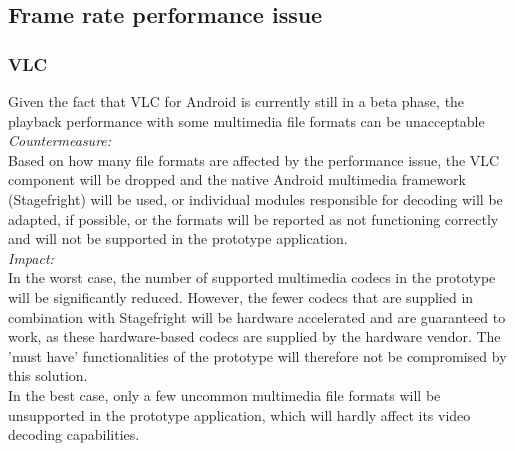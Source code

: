 \subsection{Frame rate performance issue}
\subsubsection{VLC}
Given the fact that VLC for Android is currently still in a beta phase, the playback performance with some multimedia file formats can be unacceptable\\
\newline
\textit{Countermeasure:}\\
Based on how many file formats are affected by the performance issue, the VLC component will be dropped and the native Android multimedia framework (Stagefright) will be used, or individual modules responsible for decoding will be adapted, if possible, or the formats will be reported as not functioning correctly and will not be supported in the prototype application.\\
\newline
\textit{Impact:}\\
In the worst case, the number of supported multimedia codecs in the prototype will be significantly reduced. However, the fewer codecs that are supplied in combination with Stagefright will be hardware accelerated and are guaranteed to work, as these hardware-based codecs are supplied by the hardware vendor. The 'must have' functionalities of the prototype will therefore not be compromised by this solution.\\
\newline
In the best case, only a few uncommon multimedia file formats will be unsupported in the prototype application, which will hardly affect its video decoding capabilities.





